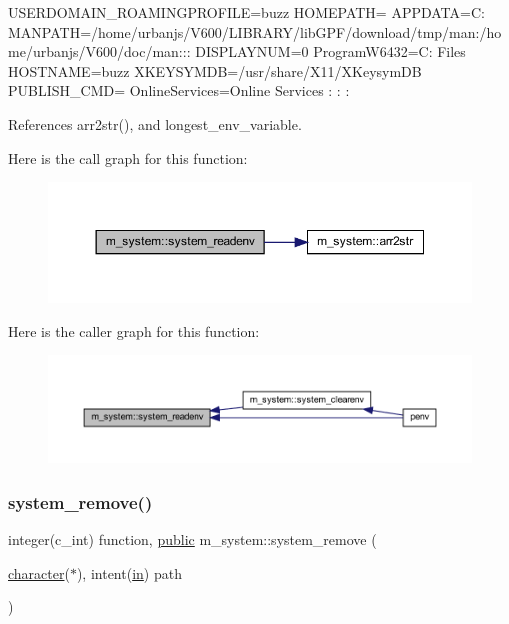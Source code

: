 U\+S\+E\+R\+D\+O\+M\+A\+I\+N\+\_\+\+R\+O\+A\+M\+I\+N\+G\+P\+R\+O\+F\+I\+LE=buzz H\+O\+M\+E\+P\+A\+TH= A\+P\+P\+D\+A\+TA=C\+: M\+A\+N\+P\+A\+TH=/home/urbanjs/\+V600/\+L\+I\+B\+R\+A\+R\+Y/lib\+G\+P\+F/download/tmp/man\+:/home/urbanjs/\+V600/doc/man\+:\+:\+: D\+I\+S\+P\+L\+A\+Y\+N\+UM=0 Program\+W6432=C\+: Files H\+O\+S\+T\+N\+A\+ME=buzz X\+K\+E\+Y\+S\+Y\+M\+DB=/usr/share/\+X11/\+X\+Keysym\+DB P\+U\+B\+L\+I\+S\+H\+\_\+\+C\+MD= Online\+Services=Online Services \+: \+: \+: 

References arr2str(), and longest\+\_\+env\+\_\+variable.

Here is the call graph for this function\+:
\nopagebreak
\begin{figure}[H]
\begin{center}
\leavevmode
\includegraphics[width=350pt]{namespacem__system_ae0e43010a82a6a25402568ccb326322d_cgraph}
\end{center}
\end{figure}
Here is the caller graph for this function\+:
\nopagebreak
\begin{figure}[H]
\begin{center}
\leavevmode
\includegraphics[width=350pt]{namespacem__system_ae0e43010a82a6a25402568ccb326322d_icgraph}
\end{center}
\end{figure}
\mbox{\label{namespacem__system_a730ae64294e3cd73bde8f0c63cdf9972}} 
\subsubsection{\texorpdfstring{system\+\_\+remove()}{system\_remove()}}
{\footnotesize\ttfamily integer(c\+\_\+int) function, \hyperlink{M__stopwatch_83_8txt_a2f74811300c361e53b430611a7d1769f}{public} m\+\_\+system\+::system\+\_\+remove (\begin{DoxyParamCaption}\item[{\hyperlink{option__stopwatch_83_8txt_abd4b21fbbd175834027b5224bfe97e66}{character}($\ast$), intent(\hyperlink{M__journal_83_8txt_afce72651d1eed785a2132bee863b2f38}{in})}]{path }\end{DoxyParamCaption})}




